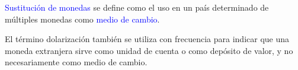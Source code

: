 \begin{frame}

\vspace{5mm}
\begin{displayquote}
\textcolor{blue}{Sustitución de monedas} se define como el uso en un país determinado de múltiples monedas como \textcolor{blue}{medio de cambio}. 
\end{displayquote}

\vspace{5mm}
\begin{displayquote}
El término \textcolor{dgreen}{dolarización} también se utiliza con frecuencia para indicar que una moneda extranjera sirve como unidad de cuenta o como \textcolor{dgreen}{depósito de valor}, y no necesariamente como medio de cambio.
\end{displayquote}
\vspace{5mm}
\raggedleft \cite{Calvo1992}\\ 

    
\end{frame}
